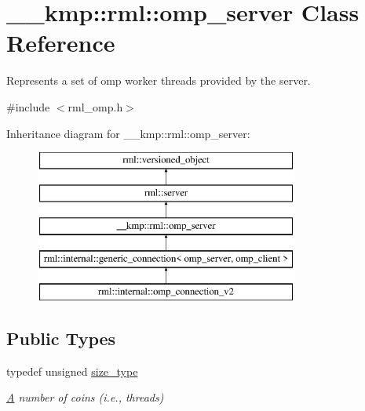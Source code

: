 \hypertarget{class____kmp_1_1rml_1_1omp__server}{}\section{\+\_\+\+\_\+kmp\+:\+:rml\+:\+:omp\+\_\+server Class Reference}
\label{class____kmp_1_1rml_1_1omp__server}


Represents a set of omp worker threads provided by the server.  




{\ttfamily \#include $<$rml\+\_\+omp.\+h$>$}

Inheritance diagram for \+\_\+\+\_\+kmp\+:\+:rml\+:\+:omp\+\_\+server\+:\begin{figure}[H]
\begin{center}
\leavevmode
\includegraphics[height=5.000000cm]{class____kmp_1_1rml_1_1omp__server}
\end{center}
\end{figure}
\subsection*{Public Types}
\begin{DoxyCompactItemize}
\item 
\hypertarget{class____kmp_1_1rml_1_1omp__server_a57f7e7cc71ec562fcb379da256cdffb0}{}typedef unsigned \hyperlink{class____kmp_1_1rml_1_1omp__server_a57f7e7cc71ec562fcb379da256cdffb0}{size\+\_\+type}\label{class____kmp_1_1rml_1_1omp__server_a57f7e7cc71ec562fcb379da256cdffb0}

\begin{DoxyCompactList}\small\item\em \hyperlink{structA}{A} number of coins (i.\+e., threads) \end{DoxyCompactList}\end{DoxyCompactItemize}
